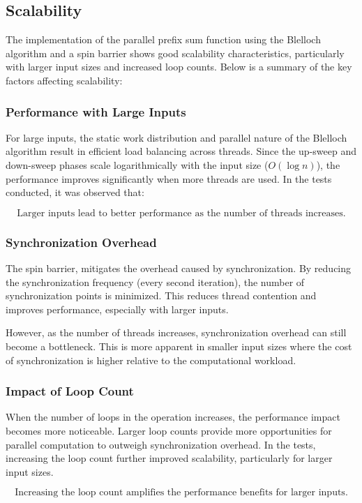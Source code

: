 \documentclass[letterpaper,12pt]{article}
\theoremstyle{remark}
\begin{document}
\subsection{Scalability}
The implementation of the parallel prefix sum function using the Blelloch algorithm and a spin barrier shows good scalability characteristics, particularly with larger input sizes and increased loop counts. Below is a summary of the key factors affecting scalability:

\subsubsection{Performance with Large Inputs}
For large inputs, the static work distribution and parallel nature of the Blelloch algorithm result in efficient load balancing across threads. Since the up-sweep and down-sweep phases scale logarithmically with the input size ($O(\log n)$), the performance improves significantly when more threads are used. In the tests conducted, it was observed that:

\[
\text{Larger inputs lead to better performance as the number of threads increases.}
\]

\subsubsection{ Synchronization Overhead}
The spin barrier, mitigates the overhead caused by synchronization. By reducing the synchronization frequency (every second iteration), the number of synchronization points is minimized. This reduces thread contention and improves performance, especially with larger inputs.

However, as the number of threads increases, synchronization overhead can still become a bottleneck. This is more apparent in smaller input sizes where the cost of synchronization is higher relative to the computational workload.

\subsubsection{Impact of Loop Count}
When the number of loops in the operation increases, the performance impact becomes more noticeable. Larger loop counts provide more opportunities for parallel computation to outweigh synchronization overhead. In the tests, increasing the loop count further improved scalability, particularly for larger input sizes.

\[
\text{Increasing the loop count amplifies the performance benefits for larger inputs.}
\]
\end{document}
